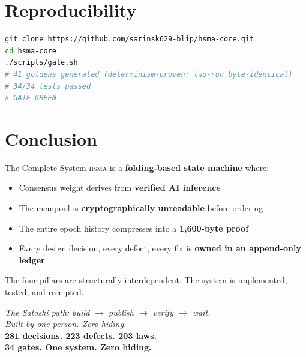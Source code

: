 \documentclass[11pt, a4paper]{article}
\newcommand{\hsma}{\textsc{hsma}}
\begin{document}
\section{Reproducibility}
\label{sec:repro}

\begin{lstlisting}[language=bash]
git clone https://github.com/sarinsk629-blip/hsma-core.git
cd hsma-core
./scripts/gate.sh
# 41 goldens generated (determinism-proven: two-run byte-identical)
# 34/34 tests passed
# GATE GREEN
\end{lstlisting}

\section{Conclusion}
\label{sec:conclusion}

\begin{keybox}{The Complete System}
\hsma{} is a \textbf{folding-based state machine} where:

\begin{itemize}
\item Consensus weight derives from \textcolor{hsmaBlue}{\textbf{verified AI inference}}
\item The mempool is \textcolor{hsmaGold}{\textbf{cryptographically unreadable}} before ordering
\item The entire epoch history compresses into a \textcolor{hsmaPurple}{\textbf{1{,}600-byte proof}}
\item Every design decision, every defect, every fix is \textcolor{hsmaGreen}{\textbf{owned in an append-only ledger}}
\end{itemize}

The four pillars are structurally interdependent. The system is
implemented, tested, and receipted.
\end{keybox}

\begin{center}
{\large\itshape The Satoshi path: build $\to$ publish $\to$ verify $\to$ wait.}\\[0.5em]
{\large\itshape Built by one person. Zero hiding.}\\[0.8em]
{\Large\bfseries\color{hsmaBlue} 281 decisions. 223 defects. 203 laws.\\
34 gates. One system. Zero hiding.}
\end{center}
\end{document}
